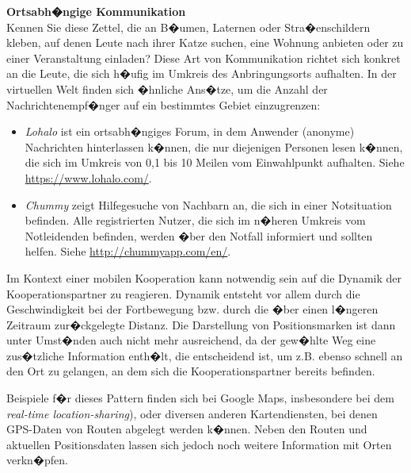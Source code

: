 \begin{example}
\textbf{Ortsabh�ngige Kommunikation}\\
Kennen Sie diese Zettel, die an B�umen, Laternen oder Stra�enschildern kleben, auf denen Leute nach ihrer Katze suchen, eine Wohnung anbieten oder zu einer Veranstaltung einladen? Diese Art von Kommunikation richtet sich konkret an die Leute, die sich h�ufig im Umkreis des Anbringungsorts aufhalten. In der virtuellen Welt finden sich �hnliche Ans�tze, um die Anzahl der Nachrichtenempf�nger auf ein bestimmtes Gebiet einzugrenzen:

\begin{itemize}
\item \textit{Lohalo} ist ein ortsabh�ngiges Forum, in dem Anwender (anonyme) Nachrichten hinterlassen k�nnen, die nur diejenigen Personen lesen k�nnen, die sich im Umkreis von 0,1 bis 10 Meilen vom Einwahlpunkt aufhalten. Siehe \url{https://www.lohalo.com/}.

\item \textit{Chummy} zeigt Hilfegesuche von Nachbarn an, die sich in einer Notsituation befinden. Alle registrierten Nutzer, die sich im n�heren Umkreis vom Notleidenden befinden, werden �ber den Notfall informiert und sollten helfen. Siehe \url{http://chummyapp.com/en/}.
\end{itemize}
\end{example}


Im Kontext einer mobilen Kooperation kann notwendig sein auf die Dynamik der Kooperationspartner zu reagieren. Dynamik entsteht vor allem durch die Geschwindigkeit bei der Fortbewegung bzw. durch die �ber einen l�ngeren Zeitraum zur�ckgelegte Distanz. Die Darstellung von Positionsmarken ist dann unter Umst�nden auch nicht mehr ausreichend, da der gew�hlte Weg eine zus�tzliche Information enth�lt, die entscheidend ist, um z.B. ebenso schnell an den Ort zu gelangen, an dem sich die Kooperationspartner bereits befinden. 


Beispiele f�r dieses Pattern finden sich bei Google Maps, insbesondere bei dem \textit{real-time location-sharing}), oder diversen anderen Kartendiensten, bei denen GPS-Daten von Routen abgelegt werden k�nnen. Neben den Routen und aktuellen Positionsdaten lassen sich jedoch noch weitere Information mit Orten verkn�pfen.

